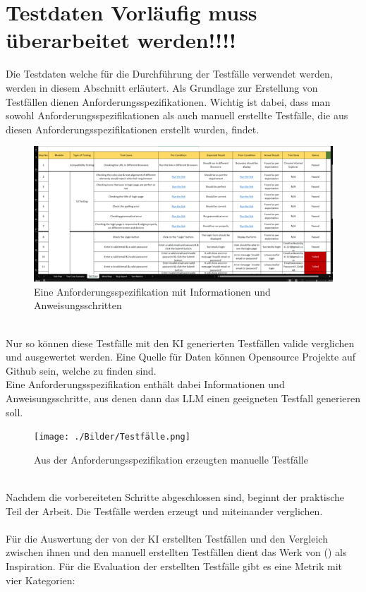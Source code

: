 \documentclass[12pt,toc=bib,toc=listof]{scrreprt}
\begin{document}
\section{Testdaten Vorläufig muss überarbeitet werden!!!!} %
\label{sec:testdaten}
Die Testdaten welche für die Durchführung der Testfälle verwendet werden, werden in diesem Abschnitt erläutert.
Als Grundlage zur Erstellung von Testfällen dienen Anforderungsspezifikationen. Wichtig ist dabei, dass man sowohl Anforderungsspezifikationen als auch manuell erstellte Testfälle, die aus diesen Anforderungsspezifikationen erstellt wurden, findet.\\
\begin{figure} [h!]
    \centering
    \includegraphics[width=1\linewidth]{./Bilder/Testspezifikationen.png}
    \caption{Eine Anforderungsspezifikation mit Informationen und Anweisungsschritten}
\end{figure}
\\
Nur so können diese Testfälle mit den KI generierten Testfällen valide verglichen und ausgewertet werden. Eine Quelle für Daten können Opensource Projekte auf Github sein, welche zu finden sind.\\
\newpage
\noindent Eine Anforderungsspezifikation enthält dabei Informationen und Anweisungsschritte, aus denen dann das LLM einen geeigneten Testfall generieren soll.\\
\begin{figure} [h!]
    \centering
    \texttt{[image: ./Bilder/Testfälle.png]}
    \caption{Aus der Anforderungsspezifikation erzeugten manuelle Testfälle}
\end{figure}
\\
Nachdem die vorbereiteten Schritte abgeschlossen sind, beginnt der praktische Teil der Arbeit. Die Testfälle werden erzeugt und miteinander verglichen.\\
\\
Für die Auswertung der von der KI erstellten Testfällen und den Vergleich zwischen ihnen und den manuell erstellten Testfällen dient das Werk von (\cite{Wang2024}) als Inspiration. Für die Evaluation der erstellten Testfälle gibt es eine Metrik mit vier Kategorien:\\
\end{document}
